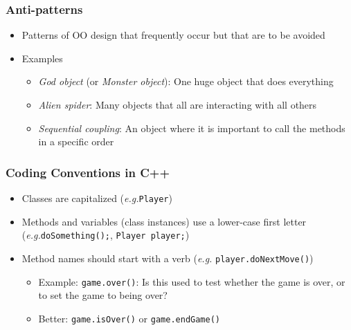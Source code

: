 \documentclass{slides}
\newcommand{\eg}{\textit{e.\thinspace g.}\xspace}
\begin{document}
\begin{frame}[fragile]
  \frametitle{Anti-patterns}
  \begin{itemize}
  \item Patterns of OO design that frequently occur but that are to be avoided
  \item Examples
    \begin{itemize}
    \item \emph{God object} (or \emph{Monster object}): One huge object that
      does everything
    \item \emph{Alien spider}: Many objects that all are interacting with all
      others
    \item \emph{Sequential coupling}: An object where it is important
      to call the methods in a specific order
    \end{itemize}
  \end{itemize}
\end{frame}

\begin{frame}[fragile]
  \frametitle{Coding Conventions in C++}
  \begin{itemize}
  \item Classes are capitalized (\eg \lstinline!Player!)
  \item Methods and variables (class instances) use a lower-case first
    letter (\eg \lstinline!doSomething();!, \lstinline!Player player;!)
  \item Method names should start with a verb (\eg
    \lstinline!player.doNextMove()!)
    \begin{itemize}
    \item Example: \lstinline!game.over()!: Is this used to test
      whether the game is over, or to set the game to being over?
    \item Better: \lstinline!game.isOver()! or
      \lstinline!game.endGame()!
    \end{itemize}


  \end{itemize}
\end{frame}
\end{document}
